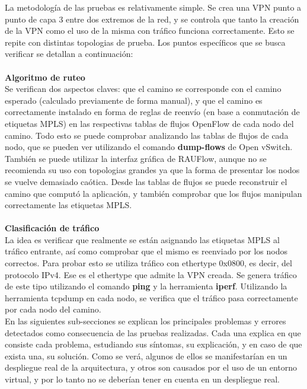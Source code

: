 La metodología de las pruebas es relativamente simple. Se crea una VPN punto a punto de capa 3 entre dos extremos de la red, y se controla que tanto la creación de la VPN como el uso de la misma con tráfico funciona correctamente. Esto se repite con distintas topologias de prueba. Los puntos específicos que se busca verificar se detallan a continuación: \\ \\
\textbf{Algoritmo de ruteo} \\
Se verifican dos aspectos claves: que el camino se corresponde con el camino esperado (calculado previamente de forma manual), y que el camino es correctamente instalado en forma de reglas de reenvío (en base a conmutación de etiquetas MPLS) en las respectivas tablas de flujos OpenFlow de cada nodo del camino. Todo esto se puede comprobar analizando las tablas de flujos de cada nodo, que se pueden ver utilizando el comando \textbf{dump-flows} de Open vSwitch. También se puede utilizar la interfaz gráfica de RAUFlow, aunque no se recomienda su uso con topologias grandes ya que la forma de presentar los nodos se vuelve demasiado caótica. Desde las tablas de flujos se puede reconstruir el camino que computó la aplicación, y también comprobar que los flujos manipulan correctamente las etiquetas MPLS. \\ \\
\textbf{Clasificación de tráfico} \\
La idea es verificar que realmente se están asignando las etiquetas MPLS al tráfico entrante, así como comprobar que el mismo es reenviado por los nodos correctos. Para probar esto se utiliza tráfico con ethertype 0x0800, es decir, del protocolo IPv4. Ese es el ethertype que admite la VPN creada. Se genera tráfico de este tipo utilizando el comando \textbf{ping} y la herramienta \textbf{iperf}. Utilizando la herramienta tcpdump en cada nodo, se verifica que el tráfico pasa correctamente por cada nodo del camino. \\

En las siguientes sub-secciones se explican los principales problemas y errores detectados como consecuencia de las pruebas realizadas. Cada una explica en que consiste cada problema, estudiando sus síntomas, su explicación, y en caso de que exista una, su solución. Como se verá, algunos de ellos se manifestarían en un despliegue real de la arquitectura, y otros son causados por el uso de un entorno virtual, y por lo tanto no se deberían tener en cuenta en un despliegue real.

